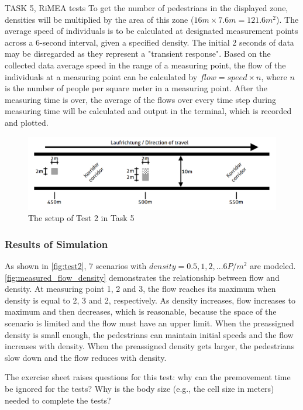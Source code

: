 \documentclass[10pt,a4paper]{article}
\begin{document}
\begin{task}{TASK 5, RiMEA tests}
To get the number of pedestrians in the displayed zone, densities will be multiplied by the area of this zone ($16m \times 7.6m = 121.6m^{2}$). The average speed of individuals is to be calculated at designated measurement points across a 6-second interval, given a specified density. The initial 2 seconds of data may be disregarded as they represent a "transient response". Based on the collected data average speed in the range of a measuring point, the flow of the individuals at a measuring point can be calculated by $flow = speed \times n$, where $n$ is the number of people per square meter in a measuring point. After the measuring time is over, the average of the flows over every time step during measuring time will be calculated and output in the terminal, which is recorded and plotted.

\begin{figure}[htbp]
      \centering
      \includegraphics[width=0.9\linewidth]{pictures/test2_setup.png}
      \caption{The setup of Test 2 in Task 5}
      \label{fig:test2_setup}
\end{figure}

\subsubsection{Results of Simulation}

As shown in \autoref{fig:test2}, 7 scenarios with $density = 0.5, 1, 2, ... 6 P/m^2$ are modeled. \autoref{fig:measured_flow_density} demonstrates the relationship between flow and density. At measuring point 1, 2 and 3, the flow reaches its maximum when density is equal to 2, 3 and 2, respectively. As density increases, flow increases to maximum and then decreases, which is reasonable, because the space of the scenario is limited and the flow must have an upper limit. When the preassigned density is small enough, the pedestrians can maintain initial speeds and the flow increases with density. When the preassigned density gets larger, the pedestrians slow down and the flow reduces with density.

The exercise sheet raises questions for this test: why can the premovement time be ignored for the tests? Why is the body size (e.g., the cell size in meters) needed to complete the tests? 


\end{task}
\end{document}
